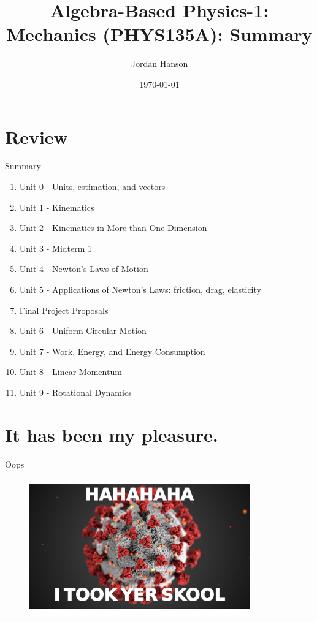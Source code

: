 \documentclass{beamer}
\title{Algebra-Based Physics-1: Mechanics (PHYS135A): Summary}
\date{\today}
\author{Jordan Hanson}
\institute{Whittier College Department of Physics and Astronomy}
\begin{document}
\maketitle

\section{Review}

\begin{frame}{Summary}
\begin{enumerate}
\item Unit 0 - Units, estimation, and vectors
\item Unit 1 - Kinematics
\item Unit 2 - Kinematics in More than One Dimension
\item Unit 3 - Midterm 1
\item Unit 4 - Newton's Laws of Motion
\item Unit 5 - Applications of Newton's Laws: friction, drag, elasticity
\item Final Project Proposals
\item Unit 6 - Uniform Circular Motion
\item Unit 7 - Work, Energy, and Energy Consumption
\item Unit 8 - Linear Momentum
\item Unit 9 - Rotational Dynamics
\end{enumerate}
\end{frame}

\section{It has been my pleasure.}

\begin{frame}{Oops}
\begin{figure}
\includegraphics[width=0.85\textwidth]{savage.pdf}
\end{figure}
\end{frame}
\end{document}
